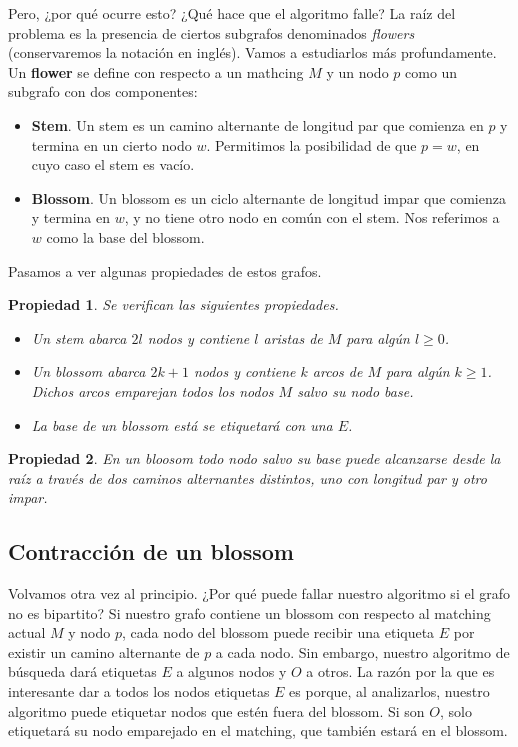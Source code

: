 \documentclass[twoside,12pt]{article}
\newtheorem{prop}{Propiedad}[section]
\begin{document}
Pero, ¿por qué ocurre esto? ¿Qué hace que el algoritmo falle? La raíz del problema es la presencia de ciertos subgrafos denominados \textit{flowers} (conservaremos la notación en inglés). Vamos a estudiarlos más profundamente. Un \textbf{flower} se define con respecto a un mathcing $M$ y un nodo $p$ como un subgrafo con dos componentes:
\begin{itemize}
\item \textbf{Stem}. Un stem es un camino alternante de longitud par que comienza en $p$ y termina en un cierto nodo $w$. Permitimos la posibilidad de que $p=w$, en cuyo caso el stem es vacío.
\item \textbf{Blossom}. Un blossom es un ciclo alternante de longitud impar que comienza y termina en $w$, y no tiene otro nodo en común con el stem. Nos referimos a $w$ como la base del blossom.
\end{itemize}
Pasamos a ver algunas propiedades de estos grafos.
\begin{prop}Se verifican las siguientes propiedades.
\begin{itemize}
\item Un stem abarca $2l$ nodos y contiene $l$ aristas de $M$ para algún $l\geq 0$. 
\item Un blossom abarca $2k+1$ nodos y contiene $k$ arcos de $M$ para algún $k\geq1$. Dichos arcos emparejan todos los nodos $M$ salvo su nodo base.  
\item La base de un blossom está se etiquetará con una $E$. 
\end{itemize}
\end{prop}

\begin{prop}
En un  bloosom todo nodo salvo su base puede alcanzarse desde la raíz a través de dos caminos alternantes distintos, uno con longitud par y otro impar.
\end{prop}
\subsection{Contracción de un blossom}
Volvamos otra vez al principio. ¿Por qué puede fallar nuestro algoritmo si el grafo no es bipartito? Si nuestro grafo contiene un blossom con respecto al matching actual $M$ y nodo $p$, cada nodo del blossom puede recibir una etiqueta $E$ por existir un camino alternante de $p$ a cada nodo. Sin embargo, nuestro algoritmo de búsqueda dará etiquetas $E$ a algunos nodos y $O$ a otros. La razón por la que es interesante dar a todos los nodos etiquetas $E$ es porque, al analizarlos, nuestro algoritmo puede etiquetar nodos que estén fuera del blossom. Si son $O$, solo etiquetará su nodo emparejado en el matching, que también estará en el blossom. 
\end{document}
